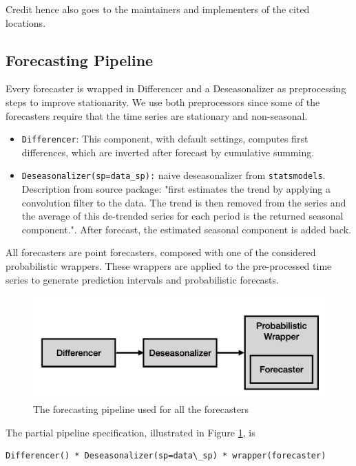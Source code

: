 Credit hence also goes to the maintainers and implementers of the cited locations.

\subsection{Forecasting Pipeline}
Every forecaster is wrapped in Differencer and a Deseasonalizer as preprocessing steps to improve stationarity. We use both preprocessors since some of the forecasters require that the time series are stationary and non-seasonal.

\begin{itemize}
    \item \texttt{Differencer}: This component, with default settings, computes first differences, which are inverted after forecast by cumulative summing.
    \item \texttt{Deseasonalizer(sp=data\_sp):} naive deseasonalizer from \texttt{statsmodels}. Description from source package: "first estimates the trend by applying a convolution filter to the data. The trend is then removed from the series and the average of this de-trended series for each period is the returned seasonal component.". After forecast, the estimated seasonal component is added back.
\end{itemize}

All forecasters are point forecasters, composed with one of the considered probabilistic wrappers. These wrappers are applied to the pre-processed time series to generate prediction intervals and probabilistic forecasts.

\begin{figure}
    \centering
    \includegraphics[width=\textwidth]{Figures/Pipeline.png}
    \caption{The forecasting pipeline used for all the forecasters}
    \label{fig:pipeline}
\end{figure}

The partial pipeline specification, illustrated in Figure \ref{fig:pipeline}, is

\begin{verbatim}
Differencer() * Deseasonalizer(sp=data\_sp) * wrapper(forecaster)
\end{verbatim}

